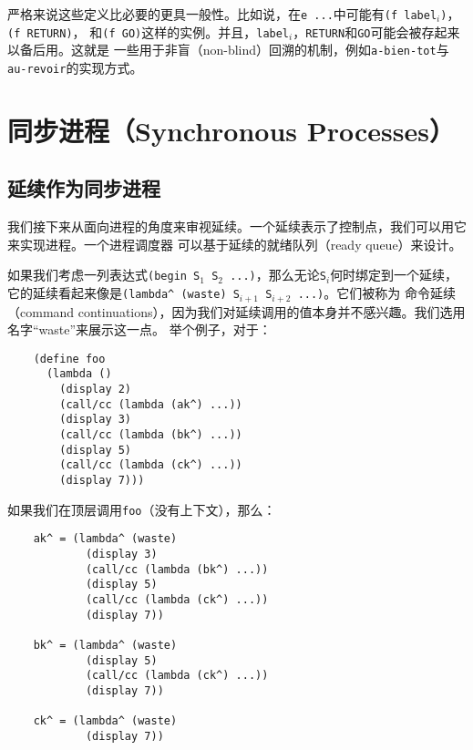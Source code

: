 \documentclass[12pt]{article}
\begin{document}
\indent{}严格来说这些定义比必要的更具一般性。比如说，在\texttt{e ...}中可能有\texttt{(f label$_i$)}，\texttt{(f RETURN)}，
和\texttt{(f GO)}这样的实例。并且，\texttt{label$_i$}，\texttt{RETURN}和\texttt{GO}可能会被存起来以备后用。这就是
一些用于非盲（non-blind）回溯的机制，例如\texttt{a-bien-tot}与\texttt{au-revoir}的实现方式。

\section{同步进程（Synchronous Processes）}

\subsection{延续作为同步进程}
\indent{}我们接下来从面向进程的角度来审视延续。一个延续表示了控制点，我们可以用它来实现进程。一个进程调度器
可以基于延续的就绪队列（ready queue）来设计。

\indent{}如果我们考虑一列表达式\texttt{(begin S$_1$ S$_2$ ...)}，那么无论\texttt{S$_i$}何时绑定到一个延续，
它的延续看起来像是\texttt{(lambda\^{} (waste) S$_{i+1}$ S$_{i+2}$ ...)}。它们被称为
命令延续（command continuations），因为我们对延续调用的值本身并不感兴趣。我们选用名字“waste”来展示这一点。
举个例子，对于：
\begin{verbatim}
    (define foo
      (lambda ()
        (display 2)
        (call/cc (lambda (ak^) ...))
        (display 3)
        (call/cc (lambda (bk^) ...))
        (display 5)
        (call/cc (lambda (ck^) ...))
        (display 7)))
\end{verbatim}
\noindent{}如果我们在顶层调用\texttt{foo}（没有上下文），那么：
\begin{verbatim}
    ak^ = (lambda^ (waste)
            (display 3)
            (call/cc (lambda (bk^) ...))
            (display 5)
            (call/cc (lambda (ck^) ...))
            (display 7))

    bk^ = (lambda^ (waste)
            (display 5)
            (call/cc (lambda (ck^) ...))
            (display 7))

    ck^ = (lambda^ (waste)
            (display 7))
\end{verbatim}
\end{document}
